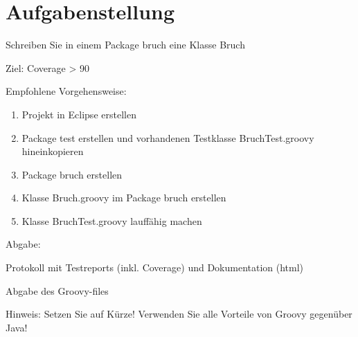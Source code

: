 

\section{Aufgabenstellung}
Schreiben Sie in einem Package bruch eine Klasse Bruch

Ziel: Coverage > 90%


Empfohlene Vorgehensweise:

\begin{enumerate}
	\item Projekt in Eclipse erstellen
	\item Package test erstellen und vorhandenen Testklasse BruchTest.groovy hineinkopieren
	\item Package bruch erstellen
	\item Klasse Bruch.groovy im Package bruch erstellen
	\item Klasse BruchTest.groovy lauffähig machen
\end{enumerate}

Abgabe:

Protokoll mit Testreports (inkl. Coverage) und Dokumentation (html)

Abgabe des Groovy-files

Hinweis: Setzen Sie auf Kürze! Verwenden Sie alle Vorteile von Groovy gegenüber Java!  
